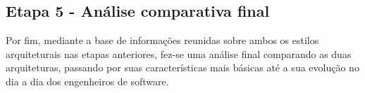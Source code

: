 \subsection{Etapa 5 - Análise comparativa final}

Por fim, mediante a base de informações reunidas sobre ambos os estilos arquiteturais nas etapas
anteriores, fez-se uma análise final comparando as duas arquiteturas, passando por suas
características mais básicas até a sua evolução no dia a dia dos engenheiros de software.
